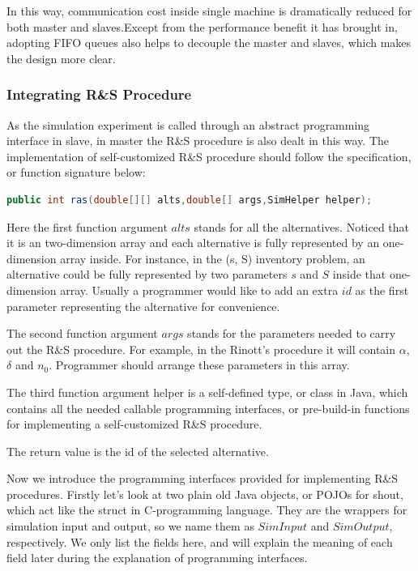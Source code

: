 In this way, communication cost inside single machine is dramatically reduced for both master and slaves.Except from the performance benefit it has brought in, adopting FIFO queues also helps to decouple the master and slaves, which makes the design more clear.

\subsubsection{Integrating R\&S Procedure}

As the simulation experiment is called through an abstract programming interface in slave, in master the R\&S procedure is also dealt in this way. The implementation of self-customized R\&S procedure should follow the specification, or function signature below:

\begin{lstlisting}[language=Java]
public int ras(double[][] alts,double[] args,SimHelper helper);
\end{lstlisting}

Here the first function argument $alts$ stands for all the alternatives. Noticed that it is an two-dimension array and each alternative is fully represented by an one-dimension array inside. For instance, in the (s, S) inventory problem, an alternative could be fully represented by two parameters $s$ and $S$ inside that one-dimension array. Usually a programmer would like to add an extra $id$ as the first parameter representing the alternative for convenience.

The second function argument $args$ stands for the parameters needed to carry out the R\&S procedure. For example, in the Rinott's procedure it will contain $\alpha$, $\delta$ and $n_0$. Programmer should arrange these parameters in this array.

The third function argument helper is a self-defined type, or class in Java, which contains all the needed callable programming interfaces, or pre-build-in functions for implementing a self-customized R\&S procedure.

The return value is the id of the selected alternative.

Now we introduce the programming interfaces provided for implementing R\&S procedures. Firstly let's look at two plain old Java objects, or POJOs for shout, which act like the struct in C-programming language. They are the wrappers for simulation input and output, so we name them as $SimInput$ and $SimOutput$, respectively. We only list the fields here, and will explain the meaning of each field later during the explanation of programming interfaces.

